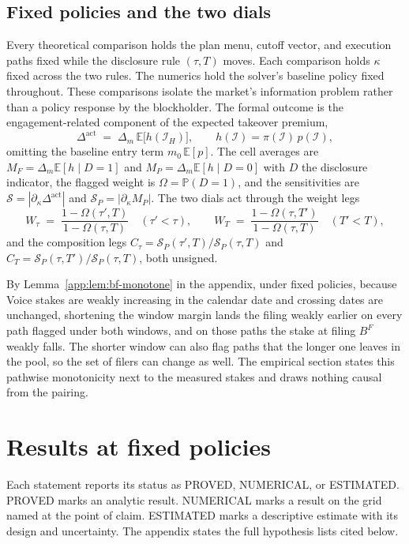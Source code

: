 \documentclass[11pt]{article}
\newcommand{\Eop}{\mathbb{E}}
\newcommand{\Prb}{\mathbb{P}}
\newcommand{\Dact}{\Delta^{\mathrm{act}}}
\begin{document}
\subsection{Fixed policies and the two dials}
\label{sec:fixed-policies}

Every theoretical comparison holds the plan menu, cutoff vector, and execution paths fixed while
the disclosure rule $(\tau,T)$ moves. Each comparison holds $\kappa$ fixed across the two rules.
The numerics hold the solver's baseline policy fixed throughout. These comparisons isolate the market's
information problem rather than a policy response by the blockholder. The formal outcome is the
engagement-related component of the expected takeover premium,
\[
\Dact \;=\; \Delta_m\,\Eop\bigl[h(\mathcal I_H)\bigr], \qquad
h(\mathcal I) = \pi(\mathcal I)\,p(\mathcal I),
\]
omitting the baseline entry term $m_0\,\Eop[p]$. The cell averages are $M_F=\Delta_m\Eop[h\mid D=1]$
and $M_P=\Delta_m\Eop[h\mid D=0]$ with $D$ the disclosure indicator, the flagged weight is
$\Omega=\Prb(D=1)$, and the sensitivities are $\mathcal S=|\partial_\kappa\Dact|$ and
$\mathcal S_P=|\partial_\kappa M_P|$. The two dials act through the weight legs
\[
W_\tau \;=\; \frac{1-\Omega(\tau',T)}{1-\Omega(\tau,T)}
\quad(\tau' < \tau),
\qquad
W_T \;=\; \frac{1-\Omega(\tau,T')}{1-\Omega(\tau,T)}
\quad(T' < T),
\]
and the composition legs $C_\tau = \mathcal S_P(\tau',T)/\mathcal S_P(\tau,T)$ and
$C_T = \mathcal S_P(\tau,T')/\mathcal S_P(\tau,T)$, both unsigned.

By Lemma~\ref{app:lem:bf-monotone} in the appendix, under fixed policies, because Voice stakes are
weakly increasing in the calendar date and crossing dates are unchanged, shortening the window
margin lands the filing weakly earlier on every path flagged under both windows, and on those
paths the stake at filing $B^F$ weakly falls. The shorter window can also flag paths that the longer one leaves in the pool, so the set of
filers can change as well. The empirical section states this
pathwise monotonicity next to the measured stakes and draws nothing causal from the pairing.

\section{Results at fixed policies}
\label{sec:results}

Each statement reports its status as PROVED, NUMERICAL, or ESTIMATED. PROVED marks an analytic
result. NUMERICAL marks a result on the grid named at the point of claim. ESTIMATED marks a
descriptive estimate with its design and uncertainty. The appendix states the full hypothesis
lists cited below.
\end{document}
